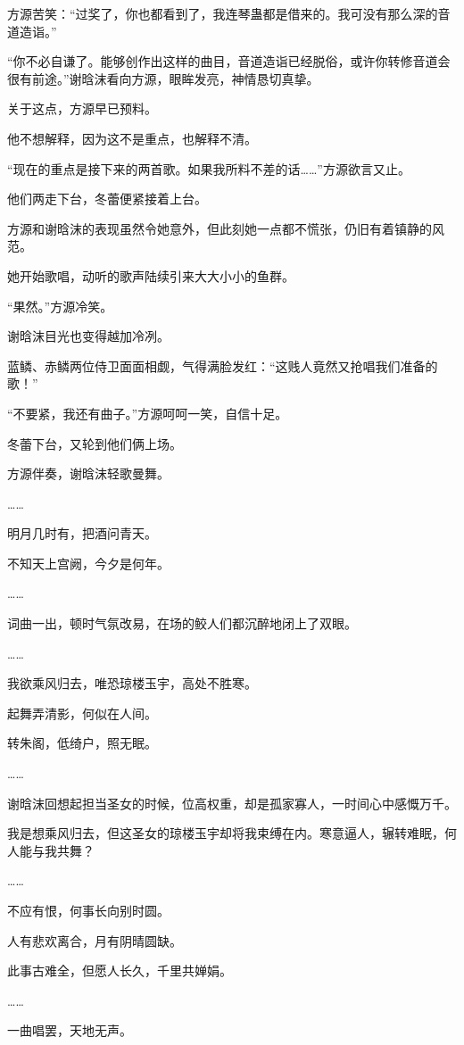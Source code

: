 \begin{this_body}
方源苦笑：“过奖了，你也都看到了，我连琴蛊都是借来的。我可没有那么深的音道造诣。”

“你不必自谦了。能够创作出这样的曲目，音道造诣已经脱俗，或许你转修音道会很有前途。”谢晗沫看向方源，眼眸发亮，神情恳切真挚。

关于这点，方源早已预料。

他不想解释，因为这不是重点，也解释不清。

“现在的重点是接下来的两首歌。如果我所料不差的话……”方源欲言又止。

他们两走下台，冬蕾便紧接着上台。

方源和谢晗沫的表现虽然令她意外，但此刻她一点都不慌张，仍旧有着镇静的风范。

她开始歌唱，动听的歌声陆续引来大大小小的鱼群。

“果然。”方源冷笑。

谢晗沫目光也变得越加冷冽。

蓝鳞、赤鳞两位侍卫面面相觑，气得满脸发红：“这贱人竟然又抢唱我们准备的歌！”

“不要紧，我还有曲子。”方源呵呵一笑，自信十足。

冬蕾下台，又轮到他们俩上场。

方源伴奏，谢晗沫轻歌曼舞。

……

明月几时有，把酒问青天。

不知天上宫阙，今夕是何年。

……

词曲一出，顿时气氛改易，在场的鲛人们都沉醉地闭上了双眼。

……

我欲乘风归去，唯恐琼楼玉宇，高处不胜寒。

起舞弄清影，何似在人间。

转朱阁，低绮户，照无眠。

……

谢晗沫回想起担当圣女的时候，位高权重，却是孤家寡人，一时间心中感慨万千。

我是想乘风归去，但这圣女的琼楼玉宇却将我束缚在内。寒意逼人，辗转难眠，何人能与我共舞？

……

不应有恨，何事长向别时圆。

人有悲欢离合，月有阴晴圆缺。

此事古难全，但愿人长久，千里共婵娟。

……

一曲唱罢，天地无声。


\end{this_body}
